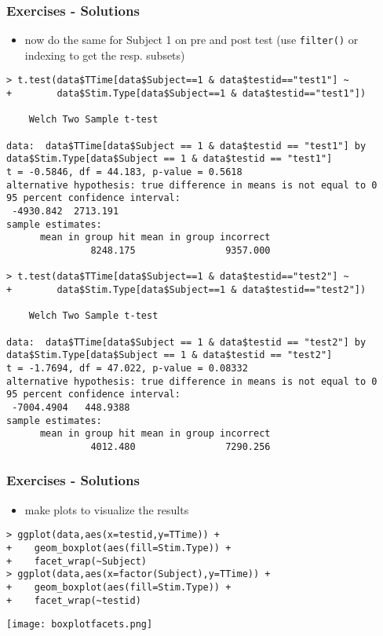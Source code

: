 \begin{frame}\frametitle{Exercises - Solutions}
  \begin{itemize}
  \item now do the same for Subject 1 on pre and post test (use \texttt{filter()} or indexing to get the resp. subsets)
  \end{itemize}\tiny
\begin{verbatim}
> t.test(data$TTime[data$Subject==1 & data$testid=="test1"] ~
+        data$Stim.Type[data$Subject==1 & data$testid=="test1"])

	Welch Two Sample t-test

data:  data$TTime[data$Subject == 1 & data$testid == "test1"] by data$Stim.Type[data$Subject == 1 & data$testid == "test1"]
t = -0.5846, df = 44.183, p-value = 0.5618
alternative hypothesis: true difference in means is not equal to 0
95 percent confidence interval:
 -4930.842  2713.191
sample estimates:
      mean in group hit mean in group incorrect 
               8248.175                9357.000 

> t.test(data$TTime[data$Subject==1 & data$testid=="test2"] ~
+        data$Stim.Type[data$Subject==1 & data$testid=="test2"])

	Welch Two Sample t-test

data:  data$TTime[data$Subject == 1 & data$testid == "test2"] by data$Stim.Type[data$Subject == 1 & data$testid == "test2"]
t = -1.7694, df = 47.022, p-value = 0.08332
alternative hypothesis: true difference in means is not equal to 0
95 percent confidence interval:
 -7004.4904   448.9388
sample estimates:
      mean in group hit mean in group incorrect 
               4012.480                7290.256 

\end{verbatim}
\end{frame}

\begin{frame}\frametitle{Exercises - Solutions}
  \begin{itemize}
  \item make plots to visualize the results
  \end{itemize}\footnotesize
\begin{verbatim}
> ggplot(data,aes(x=testid,y=TTime)) +
+    geom_boxplot(aes(fill=Stim.Type)) +
+    facet_wrap(~Subject)
> ggplot(data,aes(x=factor(Subject),y=TTime)) +
+    geom_boxplot(aes(fill=Stim.Type)) +
+    facet_wrap(~testid)
\end{verbatim}
\begin{center}
  \texttt{[image: boxplotfacets.png]}
\end{center}
\end{frame}


